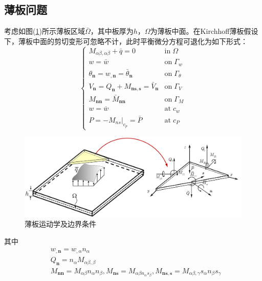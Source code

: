 \subsection{薄板问题}
考虑如图(\ref{plate})所示薄板区域$\bar \Omega$，其中板厚为$h$，$\Omega$为薄板中面。在Kirchhoff薄板假设下\cite{Liu}，薄板中面的剪切变形可忽略不计，此时平衡微分方程可退化为如下形式：
\begin{equation}
    \begin{cases}\label{P control equation}
        M_{\alpha\beta,\alpha\beta}+\bar q=0&\mathrm{in} \; \Omega\\
        w=\bar w&\mathrm{on}\;\Gamma_w\\
        \theta_{\pmb n}=w_{,\pmb n}=\bar \theta_{\pmb n}&\mathrm{on}\;\Gamma_{\theta}\\
        V_{\pmb n}=Q_{\pmb n}+M_{\pmb{ns},\pmb s}=\bar V_{\pmb n}&\mathrm{on}\;\Gamma_V\\
        M_{\pmb{nn}}=\bar M_{\pmb{nn}}&\mathrm{on}\; \Gamma_M\\
        w=\bar w&\mathrm{at} \; c_w\\
        P=-\left .M_{ns} \right \vert_{c_p}=\bar P&\mathrm{at}\; c_P
    \end{cases}
\end{equation}
\begin{figure}[H]
    \centering
    \includegraphics[scale=0.7]{figure/nomesh/plate.png}
    \caption{薄板运动学及边界条件}\label{plate}
\end{figure}
\noindent
其中
\begin{subequations}
\begin{align}
\label{wn} &w_{,\pmb n}=w_{,\alpha}n_{\alpha}\\
\label{Qn} &Q_{\pmb n}=n_{\alpha}M_{\alpha\beta,\beta}\\
\label{Mn} &M_{\pmb{nn}}=M_{\alpha\beta}n_{\alpha}n_{\beta},M_{\pmb{ns}}=M_{\alpha\beta n_{\alpha}s_{\beta}},M_{\pmb{ns,s}}=M_{\alpha\beta,\gamma}s_{\alpha}n_{\beta}s_{\gamma}
\end{align}
\end{subequations}
